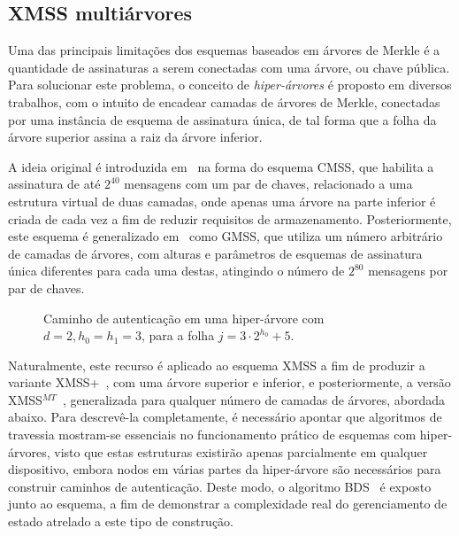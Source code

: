 \documentclass[12pt]{report}
\newcommand{\pk}{\mathcal{P}_k}
\begin{document}
\subsection{XMSS multiárvores}

Uma das principais limitações dos esquemas baseados em árvores de Merkle é a quantidade de assinaturas a serem conectadas com uma árvore, ou chave pública. Para solucionar este problema, o conceito de \emph{hiper-árvores} é proposto em diversos trabalhos, com o intuito de encadear camadas de árvores de Merkle, conectadas por uma instância de esquema de assinatura única, de tal forma que a folha da árvore superior assina a raiz da árvore inferior.

A ideia original é introduzida em~\cite{Buchmann:2006:CIM:2087445.2087479} na forma do esquema CMSS, que habilita a assinatura de até $2^{40}$ mensagens com um par de chaves, relacionado a uma estrutura virtual de duas camadas, onde apenas uma árvore na parte inferior é criada de cada vez a fim de reduzir requisitos de armazenamento. Posteriormente, este esquema é generalizado em~\cite{Buchmann:2007:MSV:1419765.1419769} como GMSS, que utiliza um número arbitrário de camadas de árvores, com alturas e parâmetros de esquemas de assinatura única diferentes para cada uma destas, atingindo o número de $2^{80}$ mensagens por par de chaves.

\begin{figure}
    \centering
    \caption{Caminho de autenticação em uma hiper-árvore com $d = 2, h_0 = h_1 = 3$, para a folha $j = 3 \cdot 2^{h_0} + 5$.}
    \label{fig:8}
\end{figure}

Naturalmente, este recurso é aplicado ao esquema XMSS a fim de produzir a variante XMSS+~\cite{xmssplus}, com uma árvore superior e inferior, e posteriormente, a versão XMSS$^{MT}$~\cite{xmssmt}, generalizada para qualquer número de camadas de árvores, abordada abaixo. Para descrevê-la completamente, é necessário apontar que algoritmos de travessia mostram-se essenciais no funcionamento prático de esquemas com hiper-árvores, visto que estas estruturas existirão apenas parcialmente em qualquer dispositivo, embora nodos em várias partes da hiper-árvore são necessários para construir caminhos de autenticação. Deste modo, o algoritmo BDS~\cite{Buchmann:2008:MTT:1473109.1473114} é exposto junto ao esquema, a fim de demonstrar a complexidade real do gerenciamento de estado atrelado a este tipo de construção.
\end{document}
